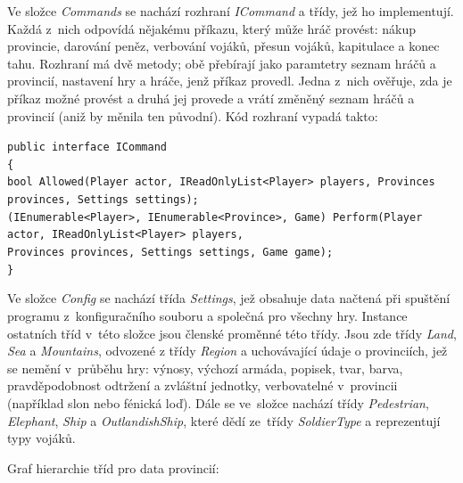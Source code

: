 \documentclass[a4paper,12pt]{article}
\def\keyword #1{\color{keyword}#1\color{black}}
\begin{document}
Ve složce \textit{Commands} se nachází rozhraní \textit{ICommand} a třídy, jež ho implementují. Každá z~nich odpovídá nějakému příkazu, který může hráč provést: nákup provincie, darování peněz, verbování vojáků, přesun vojáků, kapitulace a konec tahu. Rozhraní má dvě metody; obě přebírají jako paramtetry seznam hráčů a provincií, nastavení hry a hráče, jenž příkaz provedl. Jedna z~nich ověřuje, zda je příkaz možné provést a druhá jej provede a vrátí změněný seznam hráčů a provincií (aniž by měnila ten původní). Kód rozhraní vypadá takto:

\scriptsize\selectfont
\texttt{\keyword{public interface }ICommand}\\
\texttt{\{}\\
\hspace*{8mm}\texttt{\keyword{bool }Allowed(Player actor, IReadOnlyList<Player> players, Provinces provinces, Settings settings);}\\
\hspace*{8mm}\texttt{(IEnumerable<Player>, IEnumerable<Province>, Game) Perform(Player actor, IReadOnlyList<Player> players,}\\
\hspace*{48mm}\texttt{Provinces provinces, Settings settings, Game game);}\\
\texttt{\}}\normalsize

Ve složce \textit{Config} se nachází třída \textit{Settings}, jež obsahuje data načtená při spuštění programu z~konfiguračního souboru a společná pro všechny hry. Instance ostatních tříd v~této složce jsou členské proměnné této třídy. Jsou zde třídy \textit{Land}, \textit{Sea} a \textit{Mountains}, odvozené z třídy \textit{Region} a uchovávající údaje o provinciích, jež se nemění v~průběhu hry: výnosy, výchozí armáda, popisek, tvar, barva, pravděpodobnost odtržení a zvláštní jednotky, verbovatelné v~provincii (například slon nebo fénická loď). Dále se ve~složce nachází třídy \textit{Pedestrian}, \textit{Elephant}, \textit{Ship} a \textit{OutlandishShip}, které dědí ze~třídy \textit{SoldierType} a reprezentují typy vojáků.

Graf hierarchie tříd pro data provincií:

\end{document}
